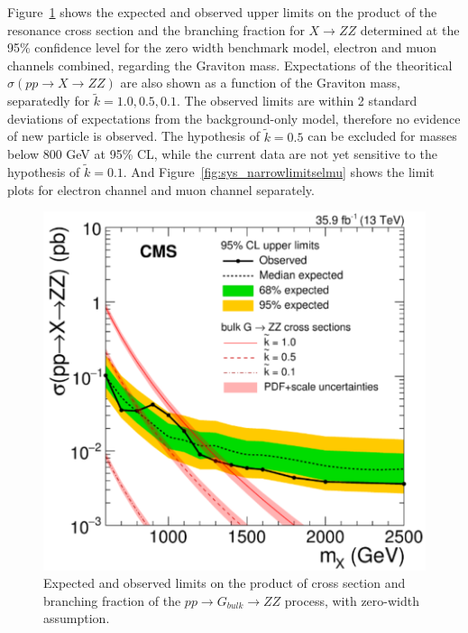 \vspace{0.3cm}
Figure~\ref{fig:sys_narrowlimits} shows the expected and observed upper limits on the product of the resonance cross section and the branching fraction for $X\rightarrow ZZ$ determined at the 95\% confidence level for the zero width benchmark model, electron and muon channels combined, regarding the Graviton mass. Expectations of the theoritical $\sigma(pp\rightarrow X\rightarrow ZZ)$ are also shown as a function of the Graviton mass, separatedly for $\tilde{k}=1.0,0.5,0.1$. The observed limits are within 2 standard deviations of expectations from the background-only model, therefore no evidence of new particle is observed. The hypothesis of $\tilde{k}=0.5$ can be excluded for masses below 800 GeV at 95\% CL, while the current data are not yet sensitive to the hypothesis of $\tilde{k}=0.1$. And Figure~\ref{fig:sys_narrowlimitselmu} shows the limit plots for electron channel and muon channel separately.

\begin{figure}[htbp]
\begin{center}
\includegraphics[width=0.9\linewidth]{figures/sys_narrowlimit.png}
\caption{Expected and observed limits on the product of cross section and branching fraction of the $pp\rightarrow G_{bulk}\rightarrow ZZ$ process, with zero-width assumption.}
\label{fig:sys_narrowlimits}
\end{center}
\end{figure}

